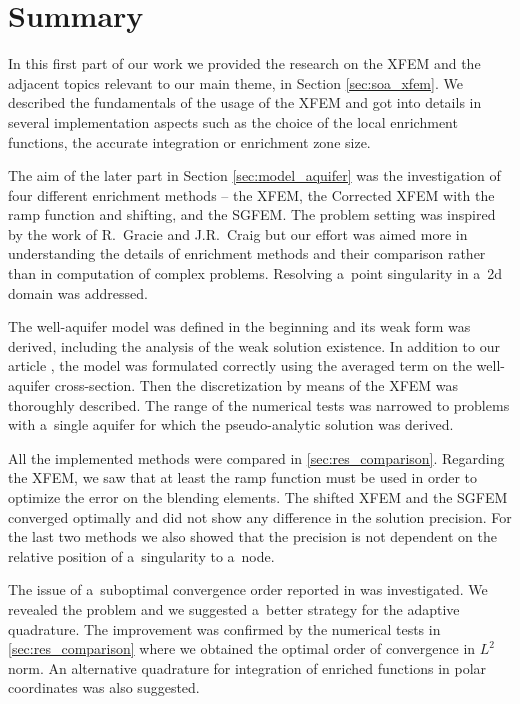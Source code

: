\section{Summary}
\label{sec:summary}

In this first part of our work we provided the research on the XFEM and the adjacent topics relevant to our main theme, in Section \ref{sec:soa_xfem}.
We described the fundamentals of the usage of the XFEM and got into details in several implementation aspects such as
the choice of the local enrichment functions, the accurate integration or enrichment zone size.

The aim of the later part in Section \ref{sec:model_aquifer} was the investigation of four different enrichment methods
-- the XFEM, the Corrected XFEM with the ramp function and shifting, and the SGFEM. 
The problem setting was inspired by the work \cite{gracie_modelling_2010,craig_using_2011} 
of R.~Gracie and J.R.~Craig but our effort was aimed more in understanding the details of enrichment methods and their comparison
rather than in computation of complex problems. Resolving a~point singularity in a~2d domain was addressed.

The well-aquifer model was defined in the beginning and its weak form was derived, including the analysis of the weak solution existence.
In addition to our article \cite{exner_2016}, the model was formulated correctly using the averaged term on the well-aquifer
cross-section. Then the discretization by means of the XFEM was thoroughly described.
The range of the numerical tests was narrowed to problems with a~single aquifer for which the pseudo-analytic solution was derived.

All the implemented methods were compared in \ref{sec:res_comparison}. Regarding the XFEM, we saw that at 
least the ramp function must be used in order to optimize the error on the blending elements. 
The shifted XFEM and the SGFEM converged optimally and did not show any difference in the solution precision.
For the last two methods we also showed that the precision is not dependent on the relative position of a~singularity to a~node.

The issue of a~suboptimal convergence order reported in \cite{gracie_modelling_2010} was investigated. 
We revealed the problem and we suggested a~better strategy for the adaptive quadrature. 
The improvement was confirmed by the numerical tests in \ref{sec:res_comparison} where we obtained the optimal 
order of convergence in $L^2$ norm.
An alternative quadrature for integration of enriched functions in polar coordinates was also suggested.

